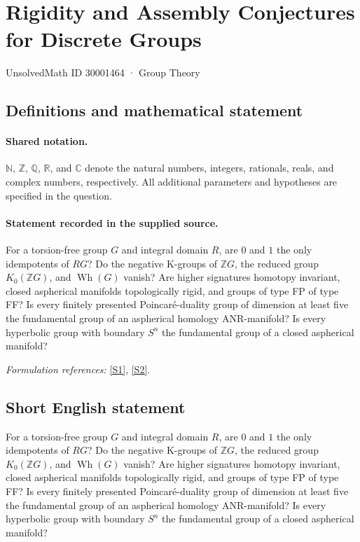 \documentclass[11pt]{article}
\newcommand{\sref}[2]{\hyperlink{source:#1:#2}{[S#2]}}
\begin{document}
\setcounter{section}{30001463}
\section{Rigidity and Assembly Conjectures for Discrete Groups}\label{30001464}
{\small UnsolvedMath ID 30001464 · Group Theory}
\subsection{Definitions and mathematical statement}

\paragraph{Shared notation.}$\mathbb N$, $\mathbb Z$, $\mathbb Q$, $\mathbb R$, and $\mathbb C$ denote the natural numbers, integers, rationals, reals, and complex numbers, respectively. All additional parameters and hypotheses are specified in the question.


\paragraph{Statement recorded in the supplied source.}
For a torsion-free group $G$ and integral domain $R$, are $0$ and $1$ the only idempotents of $RG$? Do the negative K-groups of $\mathbb{Z}G$, the reduced group $K_0(\mathbb{Z}G)$, and $\operatorname{Wh}(G)$ vanish? Are higher signatures homotopy invariant, closed aspherical manifolds topologically rigid, and groups of type FP of type FF? Is every finitely presented Poincaré-duality group of dimension at least five the fundamental group of an aspherical homology ANR-manifold? Is every hyperbolic group with boundary $S^n$ the fundamental group of a closed aspherical manifold?
\par\smallskip\textit{Formulation references:} \sref{30001464}{1}, \sref{30001464}{2}.
\subsection{Short English statement}
For a torsion-free group $G$ and integral domain $R$, are $0$ and $1$ the only idempotents of $RG$? Do the negative K-groups of $\mathbb{Z}G$, the reduced group $K_0(\mathbb{Z}G)$, and $\operatorname{Wh}(G)$ vanish? Are higher signatures homotopy invariant, closed aspherical manifolds topologically rigid, and groups of type FP of type FF? Is every finitely presented Poincaré-duality group of dimension at least five the fundamental group of an aspherical homology ANR-manifold? Is every hyperbolic group with boundary $S^n$ the fundamental group of a closed aspherical manifold?
\end{document}
